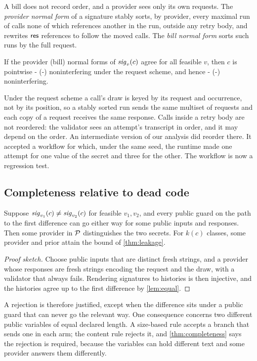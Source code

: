 A bill does not record order, and a provider sees only its own requests. The
\emph{provider normal form} of a signature stably sorts, by provider, every maximal
run of calls none of which references another in the run, outside any retry body,
and rewrites $\mathsf{res}$ references to follow the moved calls. The \emph{bill normal
form} sorts such runs by the full request.

\begin{theorem}\label{thm:observers}
If the provider (bill) normal forms of $\mathit{sig}_{v}(c)$ agree for all feasible $v$, then
$c$ is pointwise - (-) noninterfering under the request
scheme, and hence - (-) noninterfering.
\end{theorem}

Under the request scheme a call's draw is keyed by its request and occurrence, not
by its position, so a stably sorted run sends the same multiset of requests and
each copy of a request receives the same response. Calls inside a retry body are
not reordered: the validator sees an attempt's transcript in order, and it may
depend on the order. An intermediate version of our analysis did reorder there. It
accepted a workflow for which, under the same seed, the runtime made one attempt
for one value of the secret and three for the other. The workflow is now a regression
test.

\subsection{Completeness relative to dead code}\label{sec:completeness}

\begin{theorem}\label{thm:completeness}
Suppose $\mathit{sig}_{v_1}(c) \neq \mathit{sig}_{v_2}(c)$ for feasible $v_1, v_2$, and every public
guard on the path to the first difference can go either way for some public inputs
and responses. Then some provider in $\mathcal{P}$ distinguishes the two secrets. For
$k(c)$ classes, some provider and prior attain the bound of \cref{thm:leakage}.
\end{theorem}

\begin{proof}[Proof sketch]
Choose public inputs that are distinct fresh strings, and a provider whose responses
are fresh strings encoding the request and the draw, with a validator that always
fails. Rendering signatures to histories is then injective, and the histories agree
up to the first difference by \cref{lem:equal}.
\end{proof}

A rejection is therefore justified, except when the difference sits under a public
guard that can never go the relevant way. One consequence concerns two different
public variables of equal declared length. A size-based rule accepts a branch that
sends one in each arm; the content rule rejects it, and \cref{thm:completeness} says
the rejection is required, because the variables can hold different text and some
provider answers them differently.
